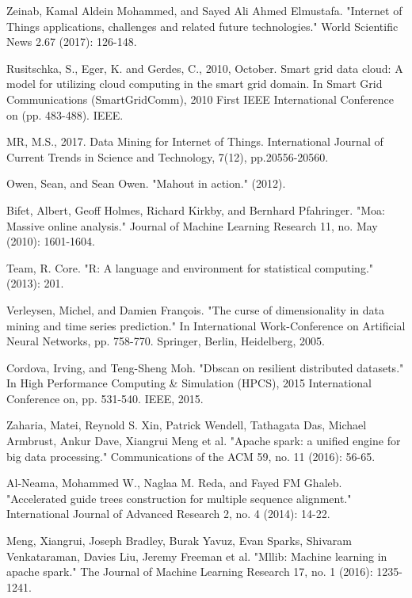 
\begin{thebibliography}{00}
	
	 Zeinab, Kamal Aldein Mohammed, and Sayed Ali Ahmed Elmustafa. "Internet of Things applications, challenges and related future technologies." World Scientific News 2.67 (2017): 126-148.
	
	 Rusitschka, S., Eger, K. and Gerdes, C., 2010, October. Smart grid data cloud: A model for utilizing cloud computing in the smart grid domain. In Smart Grid Communications (SmartGridComm), 2010 First IEEE International Conference on (pp. 483-488). IEEE.
	
	 MR, M.S., 2017. Data Mining for Internet of Things. International Journal of Current Trends in Science and Technology, 7(12), pp.20556-20560.
	
	 Owen, Sean, and Sean Owen. "Mahout in action." (2012).
	
	 Bifet, Albert, Geoff Holmes, Richard Kirkby, and Bernhard Pfahringer. "Moa: Massive online analysis." Journal of Machine Learning Research 11, no. May (2010): 1601-1604.
	
	 Team, R. Core. "R: A language and environment for statistical computing." (2013): 201.
	
	 Verleysen, Michel, and Damien François. "The curse of dimensionality in data mining and time series prediction." In International Work-Conference on Artificial Neural Networks, pp. 758-770. Springer, Berlin, Heidelberg, 2005.
	
	 Cordova, Irving, and Teng-Sheng Moh. "Dbscan on resilient distributed datasets." In High Performance Computing \& Simulation (HPCS), 2015 International Conference on, pp. 531-540. IEEE, 2015.
	
	 Zaharia, Matei, Reynold S. Xin, Patrick Wendell, Tathagata Das, Michael Armbrust, Ankur Dave, Xiangrui Meng et al. "Apache spark: a unified engine for big data processing." Communications of the ACM 59, no. 11 (2016): 56-65.
	
	 Al-Neama, Mohammed W., Naglaa M. Reda, and Fayed FM Ghaleb. "Accelerated guide trees construction for multiple sequence alignment." International Journal of Advanced Research 2, no. 4 (2014): 14-22.
	
	 Meng, Xiangrui, Joseph Bradley, Burak Yavuz, Evan Sparks, Shivaram Venkataraman, Davies Liu, Jeremy Freeman et al. "Mllib: Machine learning in apache spark." The Journal of Machine Learning Research 17, no. 1 (2016): 1235-1241.
	

\end{thebibliography}
